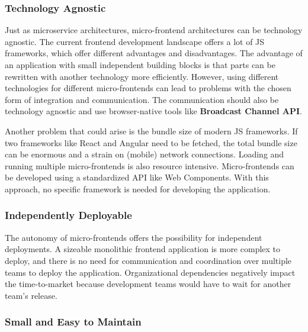 \subsubsection{Technology Agnostic}\label{subsubsection:background:micro-frontend-technology-agnostic}

Just as microservice architectures, micro-frontend architectures can be technology agnostic. The current frontend development landscape offers a lot of \ac{JS} frameworks, which offer different advantages and disadvantages. The advantage of an application with small independent building blocks is that parts can be rewritten with another technology more efficiently. \cite[14-16]{book:2020:geers:background:micro-frontends:micro-frontends-in-action} However, using different technologies for different micro-frontends can lead to problems with the chosen form of integration and communication. The communication should also be technology agnostic and use browser-native tools like \textbf{Broadcast Channel \ac{API}}.

\bigskip

\noindent Another problem that could arise is the bundle size of modern \ac{JS} frameworks. If two frameworks like React and Angular need to be fetched, the total bundle size can be enormous and a strain on (mobile) network connections. Loading and running multiple micro-frontends is also resource intensive. Micro-frontends can be developed using a standardized \ac{API} like Web Components. With this approach, no specific framework is needed for developing the application. \cite{book:2020:geers:background:micro-frontends:micro-frontends-in-action}

\subsubsection{Independently Deployable}\label{subsubsection:background:micro-frontend-independent-deployable}

The autonomy of micro-frontends offers the possibility for independent deployments. A sizeable monolithic frontend application is more complex to deploy, and there is no need for communication and coordination over multiple teams to deploy the application. Organizational dependencies negatively impact the time-to-market because development teams would have to wait for another team's release. \cite[12]{book:2020:geers:background:micro-frontends:micro-frontends-in-action}

\subsubsection{Small and Easy to Maintain}\label{subsubsection:background:micro-frontend-small-and-easy-to-maintain}

